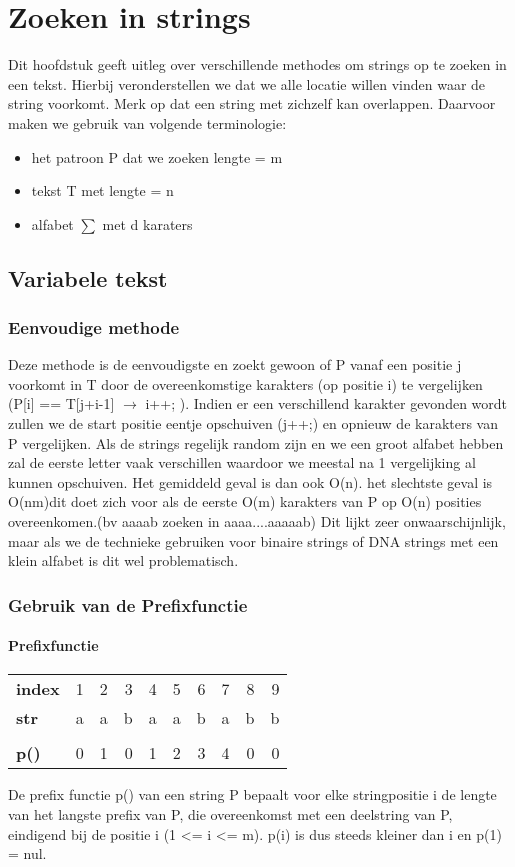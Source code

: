 \chapter{Zoeken in strings}
Dit hoofdstuk geeft uitleg over verschillende methodes om strings op te zoeken in een tekst.
Hierbij veronderstellen we dat we alle locatie willen vinden waar de string voorkomt. Merk op dat een string met zichzelf kan overlappen.
\npar
Daarvoor maken we gebruik van volgende terminologie:
\begin{itemize}
\item het patroon P dat we zoeken lengte = m 
\item tekst T met lengte = n
\item alfabet $\sum$ met d karaters 
\end{itemize}

\section{Variabele tekst}
\subsection{Eenvoudige methode}
Deze methode is de eenvoudigste en zoekt gewoon of P vanaf een positie j voorkomt in T door de overeenkomstige karakters (op positie i) te vergelijken (P[i] == T[j+i-1] $\rightarrow$ i++; ). Indien er een verschillend karakter gevonden wordt zullen we de start positie eentje opschuiven (j++;) en opnieuw de karakters van P vergelijken.
\npar
Als de strings regelijk random zijn en we een groot alfabet hebben zal de eerste letter vaak verschillen waardoor we meestal na 1 vergelijking al kunnen opschuiven. Het gemiddeld geval is dan ook O(n).
\npar het slechtste geval is O(nm)dit doet zich voor als de eerste O(m) karakters van P op O(n) posities overeenkomen.(bv aaaab zoeken in aaaa....aaaaab) Dit lijkt zeer onwaarschijnlijk, maar als we de technieke gebruiken voor binaire strings of DNA strings met een klein alfabet is dit wel problematisch.

\subsection{Gebruik van de Prefixfunctie}
\subsubsection{Prefixfunctie}
\begin{table}[h]
\begin{tabular}{lrrrrrrrrr}
\textbf{index} &1 &2 &3 &4 &5 &6 &7 &8 &9 \\
\textbf{str} &a &a &b &a &a &b &a &b &b \\
                  \\
\textbf{p()} &0 &1 &0 &1 &2 &3 &4 &0 &0
\end{tabular}
\end{table}
De prefix functie p() van een string P bepaalt voor elke stringpositie i de lengte van het langste prefix van P, die overeenkomst met een deelstring van P, eindigend bij de positie i (1 <= i <= m). p(i) is dus steeds kleiner dan i en p(1) = nul.


